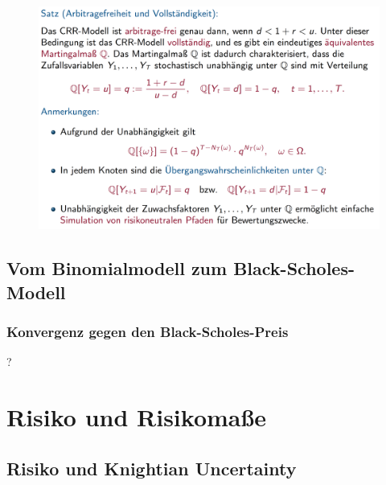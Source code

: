 \documentclass[12pt]{report}
\theoremstyle{dotless}
\theoremstyle{definition}
\begin{document}
\begin{figure}[H]
\centering
\includegraphics[width=\textwidth]{Bilder/SatzArbitragefreiheit.png}
\end{figure}

\section{Vom Binomialmodell zum Black-Scholes-Modell}

\subsection{Konvergenz gegen den Black-Scholes-Preis}

?



\chapter{Risiko und Risikomaße}

\section{Risiko und Knightian Uncertainty}
\end{document}
